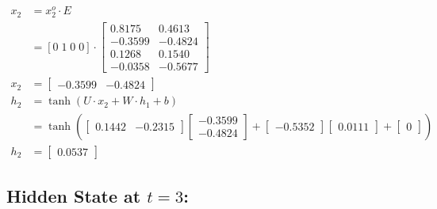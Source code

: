 \documentclass{article}
\begin{document}
\begin{align*}
x_2 & = x^o_2 \cdot E \\
    & =  [0 \; 1\; 0\; 0] \cdot \begin{bmatrix}
  0.8175 & 0.4613 \\
 -0.3599 & -0.4824 \\
  0.1268 & 0.1540 \\
 -0.0358 & -0.5677
\end{bmatrix} \\
    x_2 & = \begin{bmatrix}
  -0.3599 & -0.4824
\end{bmatrix}\\
h_2 &= \tanh(U \cdot x_2 + W \cdot h_1 + b) \\
&= \tanh\left(\begin{bmatrix}
0.1442 & -0.2315
\end{bmatrix} \begin{bmatrix}
  -0.3599 \\ -0.4824
\end{bmatrix} + \begin{bmatrix}
-0.5352
\end{bmatrix} \begin{bmatrix}
0.0111
\end{bmatrix} + \begin{bmatrix}
0
\end{bmatrix}\right) \\
h_2 &= \begin{bmatrix}
0.0537
\end{bmatrix}
\end{align*}

\subsection{Hidden State at \(t=3\):}
\end{document}
